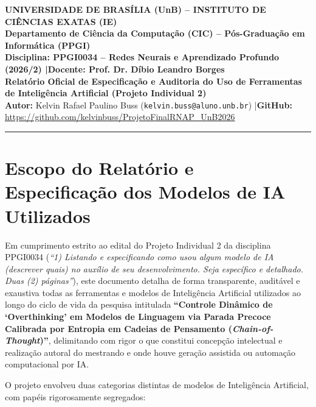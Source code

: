 \documentclass[9pt,a4paper]{extarticle}
\begin{document}
\begin{center}
    {\large\bfseries\color{unbblue} UNIVERSIDADE DE BRAS\'{I}LIA (UnB) -- INSTITUTO DE CI\^{E}NCIAS EXATAS (IE)}\\
    {\normalsize\bfseries Departamento de Ci\^{e}ncia da Computa\c{c}\~{a}o (CIC) -- P\'{o}s-Gradua\c{c}\~{a}o em Inform\'{a}tica (PPGI)}\\
    {\footnotesize\bfseries Disciplina: PPGI0034 -- Redes Neurais e Aprendizado Profundo (2026/2) \quad|\quad Docente: Prof. Dr. D\'{i}bio Leandro Borges}\\
    {\footnotesize \textbf{Relat\'{o}rio Oficial de Especifica\c{c}\~{a}o e Auditoria do Uso de Ferramentas de Intelig\^{e}ncia Artificial (Projeto Individual 2)}}\\
    {\footnotesize \textbf{Autor:} Kelvin Rafael Paulino Buss (\texttt{kelvin.buss@aluno.unb.br}) \quad|\quad \textbf{GitHub:} \url{https://github.com/kelvinbuss/ProjetoFinalRNAP_UnB2026}}
\end{center}
\vspace{-5pt}
\noindent\textcolor{unbgreen}{\rule{\linewidth}{1.2pt}}
\vspace{-7pt}

\section{Escopo do Relat\'{o}rio e Especifica\c{c}\~{a}o dos Modelos de IA Utilizados}

Em cumprimento estrito ao edital do Projeto Individual 2 da disciplina PPGI0034 (\textit{``1) Listando e especificando como usou algum modelo de IA (descrever quais) no aux\'{i}lio de seu desenvolvimento. Seja espec\'{i}fico e detalhado. Duas (2) p\'{a}ginas''}), este documento detalha de forma transparente, audit\'{a}vel e exaustiva todas as ferramentas e modelos de Intelig\^{e}ncia Artificial utilizados ao longo do ciclo de vida da pesquisa intitulada \textbf{``Controle Din\^{a}mico de `Overthinking' em Modelos de Linguagem via Parada Precoce Calibrada por Entropia em Cadeias de Pensamento (\textit{Chain-of-Thought})''}, delimitando com rigor o que constitui concep\c{c}\~{a}o intelectual e realiza\c{c}\~{a}o autoral do mestrando e onde houve gera\c{c}\~{a}o assistida ou automa\c{c}\~{a}o computacional por IA.

O projeto envolveu duas categorias distintas de modelos de Intelig\^{e}ncia Artificial, com pap\'{e}is rigorosamente segregados:
\end{document}
